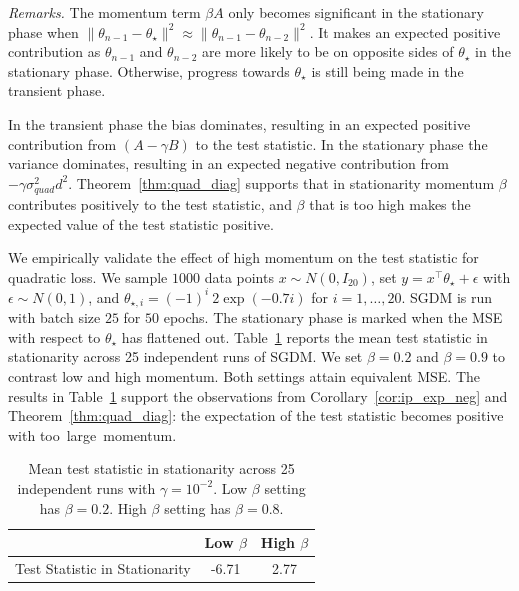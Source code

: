 \documentclass[conference]{IEEEtran}
\begin{document}
\emph{Remarks.}
The momentum term $\beta A$ only becomes significant in the stationary phase when $\| \theta_{n-1} - \theta_\star \|^2 \approx \| \theta_{n-1} - \theta_{n-2} \|^2$.
It makes an expected positive contribution as $\theta_{n-1}$ and $\theta_{n-2}$ are more likely to be on opposite sides of $\theta_\star$ in the stationary phase. Otherwise, progress towards $\theta_\star$ is still being made in the transient phase.

In the transient phase the bias dominates, resulting in an expected positive contribution from $(A-\gamma B)$ to the test statistic. 
In the stationary phase the variance dominates, resulting in an expected negative contribution from $- \gamma \sigma_{quad}^2 d^2$.
Theorem~\ref{thm:quad_diag} supports that in stationarity momentum $\beta$ contributes positively to the test statistic, and $\beta$ that is too high makes the expected value of the test statistic positive.

We empirically validate the effect of high momentum on the test statistic for quadratic loss. We sample $1000$ data points $x \sim N ( 0, I_{20} )$, set $y = x^\top \theta_\star + \epsilon$ with $\epsilon \sim N ( 0, 1 )$, and $\theta_{\star, i} = (-1)^{i} \ 2 \exp( -0.7 i )$ for $i = 1, \dots, 20$.
SGDM is run with batch size $25$ for $50$ epochs.
The stationary phase is marked when the MSE with respect to $\theta_\star$ has flattened out. Table~\ref{tab:high_momentum_ip} reports the mean test statistic in stationarity across 25 independent runs of SGDM. We set $\beta=0.2$ and $\beta=0.9$ to contrast low and high momentum. Both settings attain equivalent MSE. The  results in Table~\ref{tab:high_momentum_ip} support the observations from Corollary~\ref{cor:ip_exp_neg} and Theorem~\ref{thm:quad_diag}: the expectation of the test statistic becomes positive with too~large~momentum.


\begin{table}[h]
\caption{Mean test statistic in stationarity across 25 independent runs with $\gamma = 10^{-2}$.
Low $\beta$ setting has $\beta=0.2$. 
High $\beta$ setting has $\beta=0.8$. \vspace{-0.1in}
}
\label{tab:high_momentum_ip}
\begin{center}
\begin{tabular}{|c| c c|} 
\hline
 & Low $\beta$ & High $\beta$ \\
\hline
Test Statistic in Stationarity & -6.71 & 2.77\\
\hline
\end{tabular}
\end{center}
\end{table}
\end{document}
